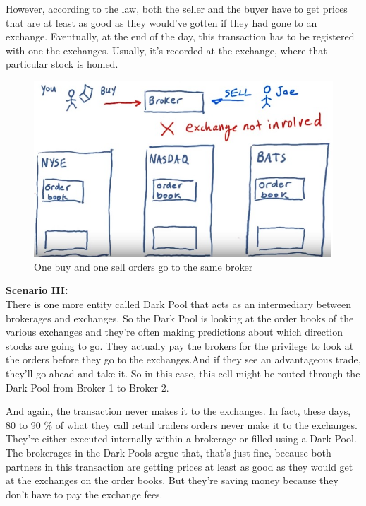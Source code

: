 \documentclass[12pt]{article}
\begin{document}
However, according to the law, both the seller and the buyer have to get prices that are at least as good as they would've gotten if they had gone to an exchange. Eventually, at the end of the day, this transaction has to be registered with one the exchanges. Usually, it's recorded at the exchange, where that particular stock is homed. 

\begin{figure}[!ht]
\centering
\includegraphics[scale=0.4]{fig/fig29}
\caption{One buy and one sell orders go to the same broker}
\end{figure}

\noindent
\textbf{Scenario III:} \\
There is one more entity called Dark Pool that acts as an intermediary between brokerages and exchanges. So the Dark Pool is looking at the order books of the various exchanges and they're often making predictions about which direction stocks are going to go. They actually pay the brokers for the privilege to look at the orders before they go to the exchanges.And if they see an advantageous trade, they'll go ahead and take it. So in this case, this cell might be routed through the Dark Pool from Broker 1 to Broker 2. 

And again, the transaction never makes it to the exchanges. In fact, these days, 80 to 90 \% of what they call retail traders orders never make it to the exchanges. They're either executed internally within a brokerage or filled using a Dark Pool. The brokerages in the Dark Pools argue that, that's just fine, because both partners in this transaction are getting prices at least as good as they would get at the exchanges on the order books. But they're saving money because they don't have to pay the exchange fees. 
\end{document}
